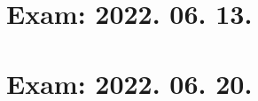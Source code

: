 \documentclass[a4paper]{article}
\begin{document}
\section{Exam: 2022. 06. 13.}
\pagebreak
\pagebreak
\pagebreak
\pagebreak
\pagebreak
\pagebreak

\section{Exam: 2022. 06. 20.}
\pagebreak
\pagebreak
\pagebreak
\pagebreak
\pagebreak
\pagebreak
\pagebreak
\end{document}
